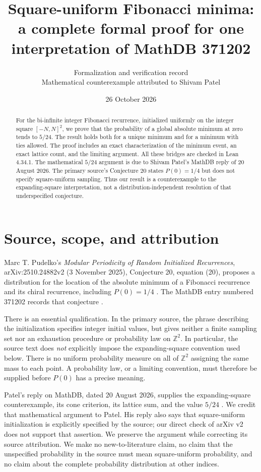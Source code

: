 \documentclass[11pt]{article}
\title{Square-uniform Fibonacci minima:\\a complete formal proof for one interpretation of MathDB 371202}
\author{Formalization and verification record\\Mathematical counterexample attributed to Shivam Patel}
\date{26 October 2026}
\newcommand{\Z}{\mathbb Z}
\begin{document}
\maketitle
\begin{abstract}
For the bi-infinite integer Fibonacci recurrence, initialized uniformly on the integer square $[-N,N]^2$, we prove that the probability of a global absolute minimum at zero tends to $5/24$. The result holds both for a unique minimum and for a minimum with ties allowed. The proof includes an exact characterization of the minimum event, an exact lattice count, and the limiting argument. All these bridges are checked in Lean 4.34.1. The mathematical $5/24$ argument is due to Shivam Patel's MathDB reply of 20 August 2026. The primary source's Conjecture 20 states $P(0)=1/4$ but does not specify square-uniform sampling. Thus our result is a counterexample to the expanding-square interpretation, not a distribution-independent resolution of that underspecified conjecture.
\end{abstract}

\section{Source, scope, and attribution}
Marc T. Pudelko's \emph{Modular Periodicity of Random Initialized Recurrences}, arXiv:2510.24882v2 (3 November 2025), Conjecture 20, equation (20), proposes a distribution for the location of the absolute minimum of a Fibonacci recurrence and its chiral recurrence, including $P(0)=1/4$ \cite{pudelko}. The MathDB entry numbered 371202 records that conjecture \cite{mathdb}.

There is an essential qualification. In the primary source, the phrase describing the initialization specifies integer initial values, but gives neither a finite sampling set nor an exhaustion procedure or probability law on $\Z^2$. In particular, the source text does \emph{not} explicitly impose the expanding-square convention used below. There is no uniform probability measure on all of $\Z^2$ assigning the same mass to each point. A probability law, or a limiting convention, must therefore be supplied before $P(0)$ has a precise meaning.

Patel's reply on MathDB, dated 20 August 2026, supplies the expanding-square counterexample, its cone criterion, its lattice sum, and the value $5/24$ \cite{patel}. We credit that mathematical argument to Patel. His reply also says that square-uniform initialization is explicitly specified by the source; our direct check of arXiv v2 does not support that assertion. We preserve the argument while correcting its source attribution. We make no new-to-literature claim, no claim that the unspecified probability in the source must mean square-uniform probability, and no claim about the complete probability distribution at other indices.
\end{document}
